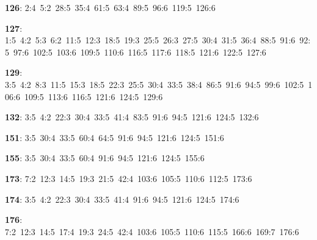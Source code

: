 \noindent \textbf{126}: 2:4\allowbreak\ 5:2\allowbreak\ 28:5\allowbreak\ 35:4\allowbreak\ 61:5\allowbreak\ 63:4\allowbreak\ 89:5\allowbreak\ 96:6\allowbreak\ 119:5\allowbreak\ 126:6\par
\noindent \textbf{127}: 1:5\allowbreak\ 4:2\allowbreak\ 5:3\allowbreak\ 6:2\allowbreak\ 11:5\allowbreak\ 12:3\allowbreak\ 18:5\allowbreak\ 19:3\allowbreak\ 25:5\allowbreak\ 26:3\allowbreak\ 27:5\allowbreak\ 30:4\allowbreak\ 31:5\allowbreak\ 36:4\allowbreak\ 88:5\allowbreak\ 91:6\allowbreak\ 92:5\allowbreak\ 97:6\allowbreak\ 102:5\allowbreak\ 103:6\allowbreak\ 109:5\allowbreak\ 110:6\allowbreak\ 116:5\allowbreak\ 117:6\allowbreak\ 118:5\allowbreak\ 121:6\allowbreak\ 122:5\allowbreak\ 127:6\par
\noindent \textbf{129}: 3:5\allowbreak\ 4:2\allowbreak\ 8:3\allowbreak\ 11:5\allowbreak\ 15:3\allowbreak\ 18:5\allowbreak\ 22:3\allowbreak\ 25:5\allowbreak\ 30:4\allowbreak\ 33:5\allowbreak\ 38:4\allowbreak\ 86:5\allowbreak\ 91:6\allowbreak\ 94:5\allowbreak\ 99:6\allowbreak\ 102:5\allowbreak\ 106:6\allowbreak\ 109:5\allowbreak\ 113:6\allowbreak\ 116:5\allowbreak\ 121:6\allowbreak\ 124:5\allowbreak\ 129:6\par
\noindent \textbf{132}: 3:5\allowbreak\ 4:2\allowbreak\ 22:3\allowbreak\ 30:4\allowbreak\ 33:5\allowbreak\ 41:4\allowbreak\ 83:5\allowbreak\ 91:6\allowbreak\ 94:5\allowbreak\ 121:6\allowbreak\ 124:5\allowbreak\ 132:6\par
\noindent \textbf{151}: 3:5\allowbreak\ 30:4\allowbreak\ 33:5\allowbreak\ 60:4\allowbreak\ 64:5\allowbreak\ 91:6\allowbreak\ 94:5\allowbreak\ 121:6\allowbreak\ 124:5\allowbreak\ 151:6\par
\noindent \textbf{155}: 3:5\allowbreak\ 30:4\allowbreak\ 33:5\allowbreak\ 60:4\allowbreak\ 91:6\allowbreak\ 94:5\allowbreak\ 121:6\allowbreak\ 124:5\allowbreak\ 155:6\par
\noindent \textbf{173}: 7:2\allowbreak\ 12:3\allowbreak\ 14:5\allowbreak\ 19:3\allowbreak\ 21:5\allowbreak\ 42:4\allowbreak\ 103:6\allowbreak\ 105:5\allowbreak\ 110:6\allowbreak\ 112:5\allowbreak\ 173:6\par
\noindent \textbf{174}: 3:5\allowbreak\ 4:2\allowbreak\ 22:3\allowbreak\ 30:4\allowbreak\ 33:5\allowbreak\ 41:4\allowbreak\ 91:6\allowbreak\ 94:5\allowbreak\ 121:6\allowbreak\ 124:5\allowbreak\ 174:6\par
\noindent \textbf{176}: 7:2\allowbreak\ 12:3\allowbreak\ 14:5\allowbreak\ 17:4\allowbreak\ 19:3\allowbreak\ 24:5\allowbreak\ 42:4\allowbreak\ 103:6\allowbreak\ 105:5\allowbreak\ 110:6\allowbreak\ 115:5\allowbreak\ 166:6\allowbreak\ 169:7\allowbreak\ 176:6\par

